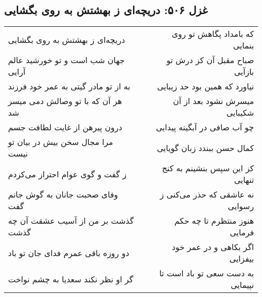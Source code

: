 \begin{center}
\section*{غزل ۵۰۶: دریچه‌ای ز بهشتش به روی بگشایی}
\label{sec:506}
\begin{longtable}{l p{0.5cm} r}
دریچه‌ای ز بهشتش به روی بگشایی
&&
که بامداد پگاهش تو روی بنمایی
\\
جهان شب است و تو خورشید عالم آرایی
&&
صباح مقبل آن کز درش تو بازآیی
\\
به از تو مادر گیتی به عمر خود فرزند
&&
نیاورد که همین بود حد زیبایی
\\
هر آن که با تو وصالش دمی میسر شد
&&
میسرش نشود بعد از آن شکیبایی
\\
درون پیرهن از غایت لطافت جسم
&&
چو آب صافی در آبگینه پیدایی
\\
مرا مجال سخن بیش در بیان تو نیست
&&
کمال حسن ببندد زبان گویایی
\\
ز گفت و گوی عوام احتراز می‌کردم
&&
کز این سپس بنشینم به کنج تنهایی
\\
وفای صحبت جانان به گوش جانم گفت
&&
نه عاشقی که حذر می‌کنی ز رسوایی
\\
گذشت بر من از آسیب عشقت آن چه گذشت
&&
هنوز منتظرم تا چه حکم فرمایی
\\
دو روزه باقی عمرم فدای جان تو باد
&&
اگر بکاهی و در عمر خود بیفزایی
\\
گر او نظر نکند سعدیا به چشم نواخت
&&
به دست سعی تو باد است تا نپیمایی
\\
\end{longtable}
\end{center}
